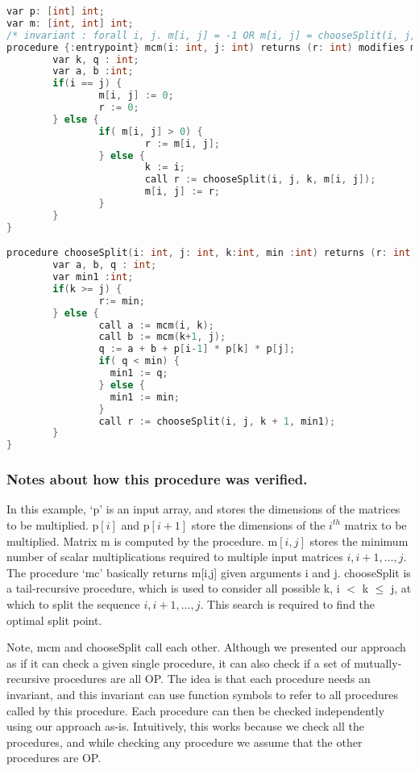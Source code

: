 \begin{lstlisting}[language=c, caption= {Returns the minimum number of multipications needed to multiply a sequence of matrices.}, label=lst:mcm]
var p: [int] int;
var m: [int, int] int;
/* invariant : forall i, j. m[i, j] = -1 OR m[i, j] = chooseSplit(i, j, i, -1) */
procedure {:entrypoint} mcm(i: int, j: int) returns (r: int) modifies m;{
        var k, q : int;
        var a, b :int;
        if(i == j) {
                m[i, j] := 0;
                r := 0;
        } else {
                if( m[i, j] > 0) {
                        r := m[i, j];
                } else {
                        k := i;
                        call r := chooseSplit(i, j, k, m[i, j]);
                        m[i, j] := r;
                }
        }
}

procedure chooseSplit(i: int, j: int, k:int, min :int) returns (r: int) modifies m;{
        var a, b, q : int;
        var min1 :int;
        if(k >= j) {
                r:= min;
        } else {        
                call a := mcm(i, k);
                call b := mcm(k+1, j);
                q := a + b + p[i-1] * p[k] * p[j];
                if( q < min) {
                  min1 := q;
                } else {
                  min1 := min;
                }
                call r := chooseSplit(i, j, k + 1, min1);
        }       
}
\end{lstlisting}

\subsubsection{Notes about how this procedure was verified.}
In this example, `p' is an input array, and stores the dimensions of the matrices
to be multiplied. p$[i]$ and p$[i+1]$ store the dimensions of the $i^\mathit{th}$
matrix to be multiplied. Matrix m is computed by the procedure. m$[i,j]$
stores the minimum number of scalar multiplications required
to multiple input matrices $i, i+1, \ldots, j$. The procedure `mc'
basically returns m[i,j] given arguments i and j. chooseSplit is a
tail-recursive procedure, which is used to consider all possible k, i $<$ k
$\leq$ j, at which to split the sequence $i, i+1, \ldots, j$. This search
is required to find the optimal split point.

Note, mcm and chooseSplit call each other. Although we presented our
approach as if it can check a given single procedure, it can also check if
a set of mutually-recursive procedures are all OP. The idea is that each
procedure needs an invariant, and this invariant can use function symbols
to refer to all procedures called by this procedure. Each procedure can
then be checked independently using our approach as-is. Intuitively, this
works because we check all the procedures, and while checking any procedure
we assume that the other procedures are OP.

